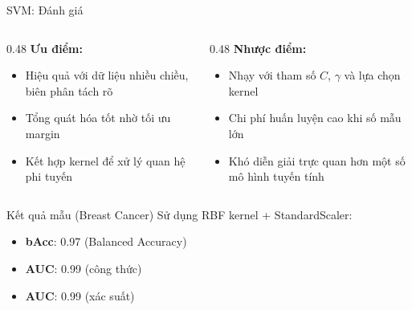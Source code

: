 \begin{frame}[shrink=10]{SVM: Đánh giá}
            \begin{columns}[T]
                \begin{column}{0.48\textwidth}
                    \textbf{Ưu điểm:}
                    \begin{itemize}
                        \item Hiệu quả với dữ liệu nhiều chiều, biên phân tách rõ
                        \item Tổng quát hóa tốt nhờ tối ưu margin
                        \item Kết hợp kernel để xử lý quan hệ phi tuyến
                    \end{itemize}
                \end{column}
                \begin{column}{0.48\textwidth}
                    \textbf{Nhược điểm:}
                    \begin{itemize}
                        \item Nhạy với tham số $C$, $\gamma$ và lựa chọn kernel
                        \item Chi phí huấn luyện cao khi số mẫu lớn
                        \item Khó diễn giải trực quan hơn một số mô hình tuyến tính
                    \end{itemize}
                \end{column}
            \end{columns}

            \begin{alertblock}{Kết quả mẫu (Breast Cancer)}
                Sử dụng RBF kernel + StandardScaler:
                \begin{itemize}
                    \item \textbf{bAcc}: 0.97 (Balanced Accuracy)
                    \item \textbf{AUC}: 0.99 (công thức)
                    \item \textbf{AUC}: 0.99 (xác suất)
                \end{itemize}
            \end{alertblock}

    \hfill{\scriptsize \cite{duchesnay2021statsml}}
\end{frame}
